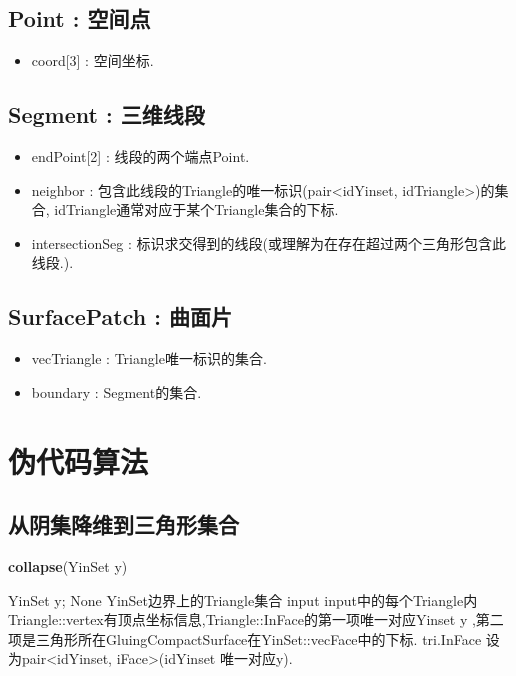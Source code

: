 \documentclass[a4paper]{book}
\renewcommand{\algorithmicrequire}{\textbf{输入:}}
\renewcommand{\algorithmicensure}{\textbf{输出:}}
\renewcommand{\algorithmicrequire}{\textbf{Input : }}
\renewcommand{\algorithmicrequire}{\textbf{Precondition : }}
\renewcommand{\algorithmicensure}{\textbf{Output : }}
\renewcommand{\algorithmicensure}{\textbf{Postcondition : }}
\numberwithin{equation}{chapter}
\theoremstyle{definition}
\begin{document}
\section{Point : 空间点}\label{P}
\begin{itemize}
    \item coord[3] : 空间坐标.
\end{itemize}

\section{Segment : 三维线段}\label{Seg}
\begin{itemize}
    \item endPoint[2] : 线段的两个端点Point.
    \item neighbor : 包含此线段的Triangle的唯一标识(pair<idYinset, idTriangle>)的集合, 
    idTriangle通常对应于某个Triangle集合的下标.
    \item intersectionSeg : 标识求交得到的线段(或理解为在存在超过两个三角形包含此线段.).
\end{itemize}

\section{SurfacePatch : 曲面片}\label{SP}
\begin{itemize}
    \item vecTriangle : Triangle唯一标识的集合.
    \item boundary : Segment的集合.
\end{itemize}



\chapter{伪代码算法}

\section{从阴集降维到三角形集合}
\begin{algorithm}\label{collapse}
	\caption{\textbf{collapse}(YinSet  y)}
	\begin{algorithmic}[1]
		\renewcommand{\algorithmicrequire}{\textbf{Input : }}
		\Require YinSet y;
		\renewcommand{\algorithmicrequire}{\textbf{Precondition : }}
		\Require None
		\renewcommand{\algorithmicensure}{\textbf{Output : }}
		\Ensure YinSet边界上的Triangle集合 input
		\renewcommand{\algorithmicensure}{\textbf{Postcondition : }}
		\Ensure input中的每个Triangle内Triangle::vertex有顶点坐标信息,Triangle::InFace的第一项唯一对应Yinset y
        ,第二项是三角形所在GluingCompactSurface在YinSet::vecFace中的下标.
        \State tri.InFace 设为pair<idYinset, iFace>(idYinset 唯一对应y).
        \EndFor
        \EndFor
		\EndFunction
	\end{algorithmic}
\end{algorithm}
\end{document}
